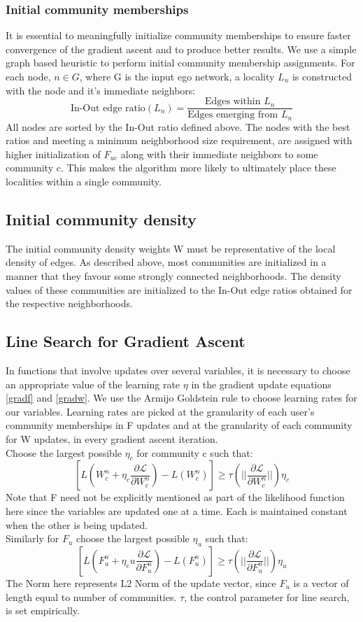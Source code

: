 \documentclass[11pt]{article}
\begin{document}
\subsubsection*{Initial community memberships}
It is essential to meaningfully initialize community memberships to ensure faster convergence of the gradient ascent and to produce better results. We use a simple graph based heuristic to perform initial community membership assignments. For each node, $n \in G$, where G is the input ego network, a locality $L_{n}$ is constructed with the node and it's immediate neighbors:
\\[5pt]
$$\text{In-Out edge ratio}(L_{n}) = \frac{\text{Edges within }L_{n}}{\text{Edges emerging from }L_{n}}$$
All nodes are sorted by the In-Out ratio defined above. The nodes with the best ratios and meeting a minimum neighborhood size requirement, are assigned with higher initialization of $F_{uc}$ along with their immediate neighbors to some community c. This makes the algorithm more likely to ultimately place these localities within a single community.

\subsection*{Initial community density}
The initial community density weights W must be representative of the local density of edges. As described above, most communities are initialized in a manner that they favour some strongly connected neighborhoods. The density values of these communities are initialized to the In-Out edge ratios obtained for the respective neighborhoods.

\subsection*{Line Search for Gradient Ascent}
In functions that involve updates over several variables, it is necessary to choose an appropriate value of the learning rate $\eta$ in the gradient update equations \ref{gradf} and \ref{gradw}. We use the Armijo Goldstein rule to choose learning rates for our variables. Learning rates are picked at the granularity of each user's community memberships in F updates and at the granularity of each community for W updates, in every gradient ascent iteration.
\\[3pt]
Choose the largest possible $\eta_c$ for community c such that:
$$[L(W_{c}^n  + \eta_c	 \frac{\partial \mathcal{L}}{\partial W_{c}^n}) - L(W_{c}^n)]  \geq \tau(||\frac{\partial \mathcal{L}}{\partial W_{c}^n}||)\eta_c$$
Note that F need not be explicitly mentioned as part of the likelihood function here since the variables are updated one at a time. Each is maintained constant when the other is being updated.
\\[5pt]
Similarly for $F_{u}$ choose the largest possible $\eta_u$ such that:
$$[L(F_{u}^n  + \eta_cu \frac{\partial \mathcal{L}}{\partial F_{u}^n}) - L(F_{u}^n)]  \geq \tau(||\frac{\partial \mathcal{L}}{\partial F_{u}^n}||)\eta_u$$
The Norm here represents L2 Norm of the update vector, since $F_{u}$ is a vector of length equal to number of communities. $\tau$, the control parameter for line search, is set empirically.
\end{document}
